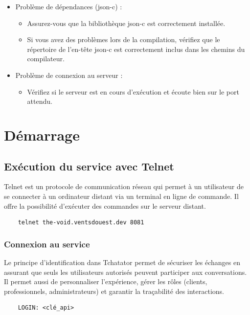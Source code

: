 \documentclass{report}
\begin{document}
\begin{itemize}
	\item Problème de dépendances (json-c) :
	\begin{itemize}
		\item Assurez-vous que la bibliothèque json-c est correctement installée.
		\item Si vous avez des problèmes lors de la compilation, vérifiez que le répertoire de l'en-tête json-c est correctement inclus dans les chemins du compilateur.
	\end{itemize}
	\item Problème de connexion au serveur :
	\begin{itemize}
		\item Vérifiez si le serveur est en cours d'exécution et écoute bien sur le port attendu.
	\end{itemize}
\end{itemize}

\chapter{Démarrage}

\section{Exécution du service avec Telnet}

Telnet est un protocole de communication réseau qui permet à un utilisateur de se connecter à un ordinateur distant via un terminal en ligne de commande. Il offre la possibilité d’exécuter des commandes sur le serveur distant.

\begin{verbatim}
	telnet the-void.ventsdouest.dev 8081
\end{verbatim}

\subsection{Connexion au service}

Le principe d'identification dans Tchatator permet de sécuriser les échanges en assurant que seuls les utilisateurs autorisés peuvent participer aux conversations. Il permet aussi de personnaliser l'expérience, gérer les rôles (clients, professionnels, administrateurs) et garantir la traçabilité des interactions.

\begin{verbatim}
	LOGIN: <clé_api>
\end{verbatim}
\end{document}
